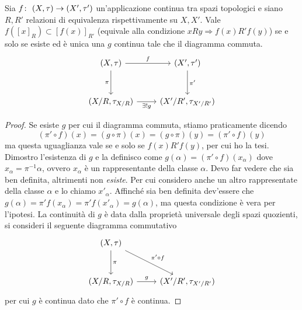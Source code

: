 \begin{lemma}
	\label{lem_qdom}
	Sia $f \colon\ (X, \tau) \rightarrow (X', \tau')$ un'applicazione continua tra spazi topologici e siano $R, R'$ relazioni di equivalenza rispettivamente su $X, X'$. Vale $f(\left[x\right]_R) \subset \left[f(x)\right]_{R'}$ (equivale alla condizione $xRy \Rightarrow f(x)R'f(y)$) se e solo se esiste ed è unica una $g$ continua tale che il diagramma commuta.
	\begin{equation*}
	\begin{tikzcd}[row sep = 3em]
		(X, \tau) \arrow[swap]{d}{\pi} \arrow{r}{f} & (X', \tau') \arrow{d}{\pi'}\\
		(X/R, \tau_{X/R}) \arrow[swap]{r}{\exists! g} & (X'/R', \tau_{X'/R'})
	\end{tikzcd}
	\end{equation*} 	
	
\end{lemma}
\begin{proof}
	Se esiste $g$ per cui il diagramma commuta, stiamo praticamente dicendo 
	\begin{equation*}
		(\pi' \circ f)(x) = (g \circ \pi)(x) = (g \circ \pi)(y) = (\pi' \circ f)(y)
	\end{equation*}
	ma questa uguaglianza vale se e solo se $f(x) R' f(y)$, per cui ho la tesi.\\
	
	Dimostro l'esistenza di $g$ e la definisco come $g(\alpha) = (\pi' \circ f)(x_\alpha)$ dove $x_\alpha = \pi^{-1}\alpha$, ovvero $x_\alpha$ è un rappresentante della classe $\alpha$. Devo far vedere che sia ben definita, altrimenti non \textit{esiste}.
	Per cui considero anche un altro rappresentate della classe $\alpha$ e lo chiamo $x'_\alpha$. Affinché sia ben definita dev'essere che $g(\alpha) = \pi'f(x_\alpha) = \pi' f(x'_\alpha) = g(\alpha)$, ma questa condizione è vera per l'ipotesi. La continuità di $g$ è data dalla proprietà universale degli spazi quozienti, si consideri il seguente diagramma commutativo
	\begin{equation*}
		\begin{tikzcd}[row sep = 3em]
			(X,\tau) \arrow{d}{\pi} \arrow{rd}{\pi' \circ f} & \\
			(X/R, \tau_{X/R}) \arrow{r}{g} & (X'/R', \tau_{X'/R'})
		\end{tikzcd}
	\end{equation*}
	per cui $g$ è continua dato che $\pi' \circ f$ è continua.
\end{proof}

